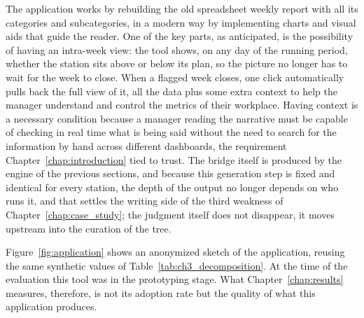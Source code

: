 \documentclass[12pt,a4paper,openright,twoside]{book}
\begin{document}
The application works by rebuilding the old spreadsheet weekly report with all its categories and subcategories, in a modern way by implementing charts and visual aids that guide the reader.
One of the key parts, as anticipated, is the possibility of having an intra-week view: the tool shows, on any day of the running period, whether the station sits above or below its plan, so the picture no longer has to wait for the week to close.
When a flagged week closes, one click automatically pulls back the full view of it, all the data plus some extra context to help the manager understand and control the metrics of their workplace.
Having context is a necessary condition because a manager reading the narrative must be capable of checking in real time what is being said without the need to search for the information by hand across different dashboards, the requirement Chapter~\ref{chap:introduction} tied to trust.
The bridge itself is produced by the engine of the previous sections, and because this generation step is fixed and identical for every station, the depth of the output no longer depends on who runs it, and that settles the writing side of the third weakness of Chapter~\ref{chap:case_study}; the judgment itself does not disappear, it moves upstream into the curation of the tree.

Figure~\ref{fig:application} shows an anonymized sketch of the application, reusing the same synthetic values of Table~\ref{tab:ch3_decomposition}. 
At the time of the evaluation this tool was in the prototyping stage.
What Chapter~\ref{chap:results} measures, therefore, is not its adoption rate but the quality of what this application produces.
\end{document}
